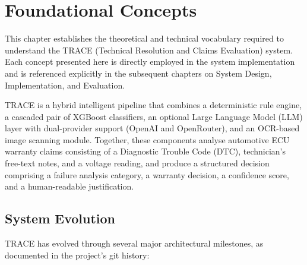 \documentclass[10pt]{article}
\begin{document}
\section{Foundational Concepts}

This chapter establishes the theoretical and technical vocabulary required to understand the TRACE (Technical Resolution and Claims Evaluation) system. Each concept presented here is directly employed in the system implementation and is referenced explicitly in the subsequent chapters on System Design, Implementation, and Evaluation.

TRACE is a hybrid intelligent pipeline that combines a deterministic rule engine, a cascaded pair of XGBoost classifiers, an optional Large Language Model (LLM) layer with dual-provider support (OpenAI and OpenRouter), and an OCR-based image scanning module. Together, these components analyse automotive ECU warranty claims consisting of a Diagnostic Trouble Code (DTC), technician's free-text notes, and a voltage reading, and produce a structured decision comprising a failure analysis category, a warranty decision, a confidence score, and a human-readable justification.

\subsection{System Evolution}

TRACE has evolved through several major architectural milestones, as documented in the project's git history:
\end{document}
